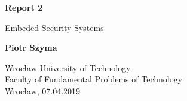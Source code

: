 \begin{titlepage}
  \begin{center}
      \vspace*{1cm}

      \textbf{Report 2}

      \vspace{0.5cm}
       Embeded Security Systems

      \vspace{1.5cm}

      \textbf{Piotr Szyma}

      \vfill

      \vspace{0.8cm}

      Wrocław University of Technology\\
      Faculty of Fundamental Problems of Technology\\
      Wrocław, 07.04.2019

  \end{center}
\end{titlepage}